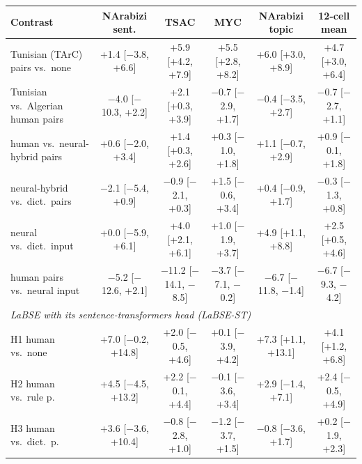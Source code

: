\begin{tabular}{l cccc c}
\toprule
Contrast & NArabizi sent. & TSAC & MYC & NArabizi topic & 12-cell mean \\
\midrule
Tunisian (TArC) pairs vs.\ none & +1.4 [$-$3.8, +6.6] & +5.9 [+4.2, +7.9] & +5.5 [+2.8, +8.2] & +6.0 [+3.0, +8.9] & +4.7 [+3.0, +6.4] \\
Tunisian vs.\ Algerian human pairs & $-$4.0 [$-$10.3, +2.2] & +2.1 [+0.3, +3.9] & $-$0.7 [$-$2.9, +1.7] & $-$0.4 [$-$3.5, +2.7] & $-$0.7 [$-$2.7, +1.1] \\
human vs.\ neural-hybrid pairs & +0.6 [$-$2.0, +3.4] & +1.4 [+0.3, +2.6] & +0.3 [$-$1.0, +1.8] & +1.1 [$-$0.7, +2.9] & +0.9 [$-$0.1, +1.8] \\
neural-hybrid vs.\ dict.\ pairs & $-$2.1 [$-$5.4, +0.9] & $-$0.9 [$-$2.1, +0.3] & +1.5 [$-$0.6, +3.4] & +0.4 [$-$0.9, +1.7] & $-$0.3 [$-$1.3, +0.8] \\
neural vs.\ dict.\ input & +0.0 [$-$5.9, +6.1] & +4.0 [+2.1, +6.1] & +1.0 [$-$1.9, +3.7] & +4.9 [+1.1, +8.8] & +2.5 [+0.5, +4.6] \\
human pairs vs.\ neural input & $-$5.2 [$-$12.6, +2.1] & $-$11.2 [$-$14.1, $-$8.5] & $-$3.7 [$-$7.1, $-$0.2] & $-$6.7 [$-$11.8, $-$1.4] & $-$6.7 [$-$9.3, $-$4.2] \\
\midrule
\multicolumn{6}{l}{\textit{LaBSE with its sentence-transformers head (LaBSE-ST)}} \\
H1 human vs.\ none & +7.0 [$-$0.2, +14.8] & +2.0 [$-$0.5, +4.6] & +0.1 [$-$3.9, +4.2] & +7.3 [+1.1, +13.1] & +4.1 [+1.2, +6.8] \\
H2 human vs.\ rule p. & +4.5 [$-$4.5, +13.2] & +2.2 [$-$0.1, +4.4] & $-$0.1 [$-$3.6, +3.4] & +2.9 [$-$1.4, +7.1] & +2.4 [$-$0.5, +4.9] \\
H3 human vs.\ dict.\ p. & +3.6 [$-$3.6, +10.4] & $-$0.8 [$-$2.8, +1.0] & $-$1.2 [$-$3.7, +1.5] & $-$0.8 [$-$3.6, +1.7] & +0.2 [$-$1.9, +2.3] \\
\bottomrule
\end{tabular}
